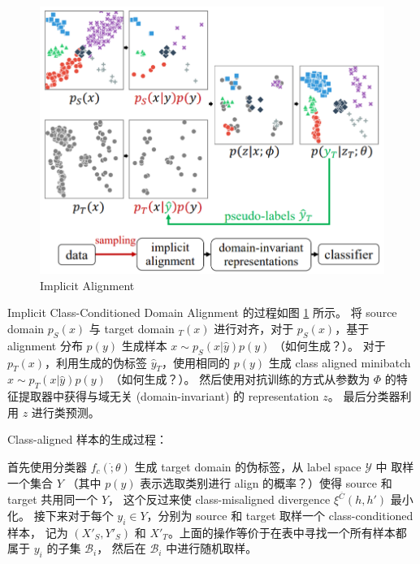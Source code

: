 \documentclass[UTF8]{ctexart}
\begin{document}
                \begin{figure}[ht]
                    \centering
                    \includegraphics[scale=0.4]{Week07_implicit.png}
                    \caption{Implicit Alignment}
                    \label{fig:implicit}
                \end{figure}

                Implicit Class-Conditioned Domain Alignment 的过程如图 \ref{fig:implicit} 所示。
                将 source domain $p_S(x)$ 与 target domain $_T(x)$ 进行对齐，对于 $p_S(x)$，基于 alignment 分布 $p(y)$ 生成样本 $x \sim p_S(x|\hat{y})p(y)$ （如何生成？）。
                对于 $p_T(x)$，利用生成的伪标签 $\hat{y}_T$，使用相同的 $p(y)$ 生成 class aligned minibatch $x\sim p_T(x|\hat{y})p(y)$ （如何生成？）。
                然后使用对抗训练的方式从参数为 $\Phi$ 的特征提取器中获得与域无关 (domain-invariant) 的 representation $z$。
                最后分类器利用 $z$ 进行类预测。

                Class-aligned 样本的生成过程：

                首先使用分类器 $f_c(\dot;\theta)$ 生成 target domain 的伪标签，从 label space $\mathcal Y$ 中
                取样一个集合 $Y$ （其中 $p(y)$ 表示选取类别进行 align 的概率？）使得 source 和 target 共用同一个 $Y$，
                这个反过来使 class-misaligned divergence $\xi^{\overline{C}}(h, h')$ 最小化。
                接下来对于每个 $y_i \in Y$，分别为 source 和 target 取样一个 class-conditioned 样本，
                记为 $(X'_S, Y'_S)$ 和 $X'_T$。上面的操作等价于在表中寻找一个所有样本都属于 $y_i$ 的子集 $\mathcal B_i$，
                然后在 $\mathcal B_i$ 中进行随机取样。
\end{document}
